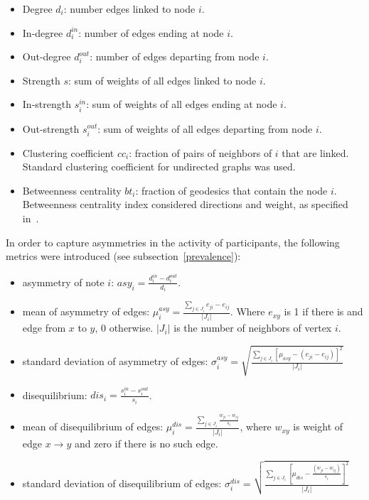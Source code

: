 \documentclass[%
 aip,
 jmp,%
 amsmath,amssymb,
 reprint,%
]{revtex4-1}
\begin{document}
\begin{itemize}
    \item Degree $d_i$: number edges linked to node $i$.
    \item In-degree $d_i^{in}$: number of edges ending at node $i$.
    \item Out-degree $d_i^{out}$: number of edges departing from node $i$.
    \item Strength $s$: sum of weights of all edges linked to node $i$.
    \item In-strength $s_i^{in}$: sum of weights of all edges ending at node $i$.
    \item Out-strength $s_i^{out}$: sum of weights of all edges departing from node $i$.
    \item Clustering coefficient $cc_i$: fraction of pairs of neighbors of $i$ that are linked. Standard clustering coefficient for undirected graphs was used.
    \item Betweenness centrality $bt_i$: fraction of geodesics that contain the node $i$. Betweenness centrality index considered directions and weight, as specified in~\cite{faster}.
\end{itemize}

In order to capture asymmetries in the activity of participants, the following metrics were introduced (see subsection~\ref{prevalence}):

\begin{itemize}
    \item asymmetry of note $i$: $asy_i=\frac{d_i^{in}-d_i^{out}}{d_i}$.
    \item mean of asymmetry of edges: $\mu_i^{asy}=\frac{\sum_{j\in J_i} e_{ji}-e_{ij}}{|J_i|}$. Where $e_{xy}$ is 1 if there is and edge from $x$ to $y$, $0$ otherwise. $|J_i|$ is the number of neighbors of vertex $i$.
    \item standard deviation of asymmetry of edges: $\sigma_i^{asy}=\sqrt{\frac{\sum_{j\in J_i}[\mu_{asy} -(e_{ji}-e_{ij}) ]^2  }{|J_i|}  }$
    \item disequilibrium: $dis_i=\frac{s_i^{in}-s_i^{out}}{s_i}$.
    \item mean of disequilibrium of edges: $\mu_i^{dis}=\frac{\sum_{j \in J_i}\frac{w_{ji}-w_{ij}}{s_i}}{|J_i|}$, where $w_{xy}$ is weight of edge $x\rightarrow y$ and zero if there is no such edge.
    \item standard deviation of disequilibrium of edges: $\sigma_i^{dis}=\sqrt{\frac{\sum_{j\in J_i}[\mu_{dis}-\frac{(w_{ji}-w_{ij})}{s_i}]^2}{|J_i|}}$
\end{itemize}
\end{document}
